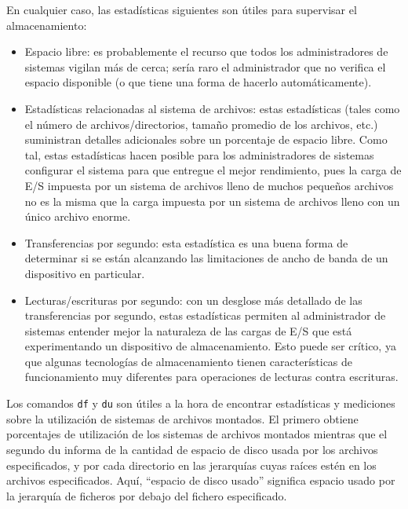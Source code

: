 \documentclass[12pt]{article}
\begin{document}
En cualquier caso, las estadísticas siguientes son útiles para supervisar 
el almacenamiento:

\begin{itemize}
\item Espacio libre: es probablemente el recurso que todos los 
administradores de sistemas vigilan más de cerca; sería raro el 
administrador que no verifica el espacio disponible (o que tiene una 
forma de hacerlo automáticamente).

\item Estadísticas relacionadas al sistema de archivos: estas estadísticas
 (tales como el número de archivos/directorios, tamaño promedio de los 
archivos, etc.) suministran detalles adicionales sobre un porcentaje de 
espacio libre. Como tal, estas estadísticas hacen posible para los 
administradores de sistemas configurar el sistema para que entregue el 
mejor rendimiento, pues la carga de E/S impuesta por un sistema de 
archivos lleno de muchos pequeños archivos no es la misma que la carga 
impuesta por un sistema de archivos lleno con un único archivo enorme.

\item Transferencias por segundo: esta estadística es una buena forma de 
determinar si se están alcanzando las limitaciones de ancho de banda de 
un dispositivo en particular.

\item Lecturas/escrituras por segundo: con un desglose más detallado de 
las transferencias por segundo, estas estadísticas permiten al 
administrador de sistemas entender mejor la naturaleza de las cargas de 
E/S que está experimentando un dispositivo de almacenamiento. Esto puede 
ser crítico, ya que algunas tecnologías de almacenamiento tienen 
características de funcionamiento muy diferentes para operaciones de 
lecturas contra escrituras.
\end{itemize}

Los comandos \texttt{df} y \texttt{du} son útiles a la hora de encontrar 
estadísticas y mediciones sobre la utilización de sistemas de archivos 
montados. El primero obtiene porcentajes de utilización de los sistemas 
de archivos montados mientras que el segundo du  informa  de  la cantidad 
de espacio de disco usada por los archivos especificados, y por cada 
directorio en  las  jerarquías  cuyas  raíces estén  en  los  archivos 
especificados.  Aquí, ``espacio de disco usado'' significa espacio usado 
por la jerarquía de  ficheros  por  debajo  del fichero especificado. 
\end{document}
